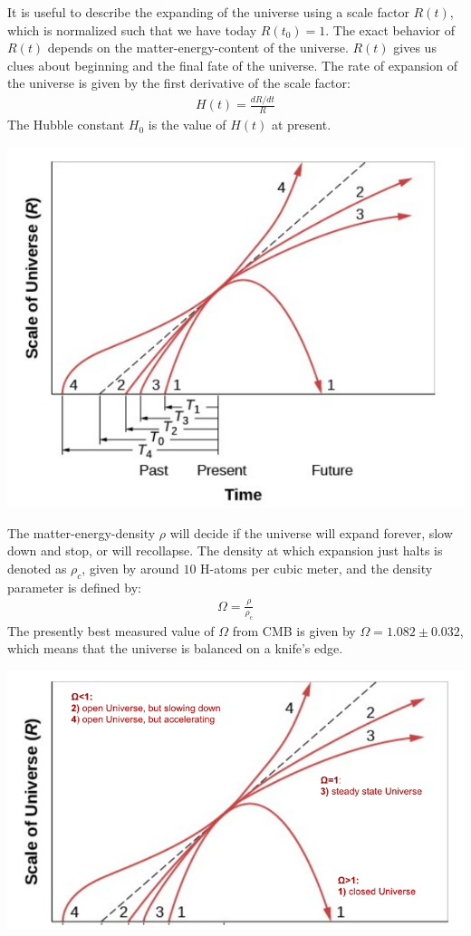 \documentclass[11pt]{article}
\theoremstyle{break}
\theoremstyle{break}
\begin{document}
It is useful to describe the expanding of the universe using a scale factor $R(t)$, which is normalized such that we have today $R(t_0) = 1$. The exact behavior of $R(t)$ depends on the matter-energy-content of the universe. $R(t)$ gives us clues about beginning and the final fate of the universe. The rate of expansion of the universe is given by the first derivative of the scale factor:
\begin{align*}
H(t) = \frac{dR/dt}{R}
\end{align*}
The Hubble constant $H_0$ is the value of $H(t)$ at present.
\begin{center}
\includegraphics[scale=0.8]{scaleFactor}
\end{center}

The matter-energy-density $\rho$ will decide if the universe will expand forever, slow down and stop, or will recollapse. The density at which expansion just halts is denoted as $\rho_c$, given by around $10$ H-atoms per cubic meter, and the density parameter is defined by:
\begin{align*}
\Omega = \frac{\rho}{\rho_c}
\end{align*}
The presently best measured value of $\Omega$ from CMB is given by $\Omega = 1.082 \pm 0.032$, which means that the universe is balanced on a knife's edge. 
\begin{center}
\includegraphics[scale=0.65]{Omega.png}
\end{center}
\end{document}
